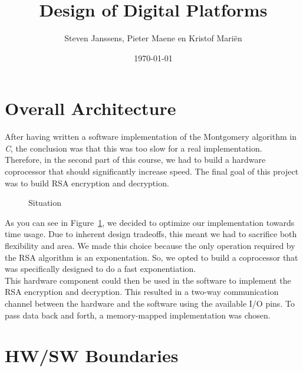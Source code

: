 \documentclass[a4paper]{article}
\title{Design of Digital Platforms}
\author{Steven Janssens, Pieter Maene en Kristof Mari\"en}
\date{\today}
\begin{document}
\maketitle

\section{Overall Architecture}

After having written a software implementation of the Montgomery algorithm in \textit{C}, the conclusion was that this was too slow for a real implementation. Therefore, in the second part of this course, we had to build a hardware coprocessor that should significantly increase speed. The final goal of this project was to build RSA encryption and decryption.\\

\begin{figure}[h]
	\caption{Situation}
	\label{fig:situation}
\end{figure}

As you can see in Figure~\ref{fig:situation}, we decided to optimize our implementation towards time usage. Due to inherent design tradeoffs, this meant we had to sacrifice both flexibility and area. We made this choice because the only operation required by the RSA algorithm is an exponentation. So, we opted to build a coprocessor that was specifically designed to do a fast exponentiation.\\

This hardware component could then be used in the software to implement the RSA encryption and decryption. This resulted in a two-way communication channel between the hardware and the software using the available I/O pins. To pass data back and forth, a memory-mapped implementation was chosen.

\section{HW/SW Boundaries}
\end{document}
